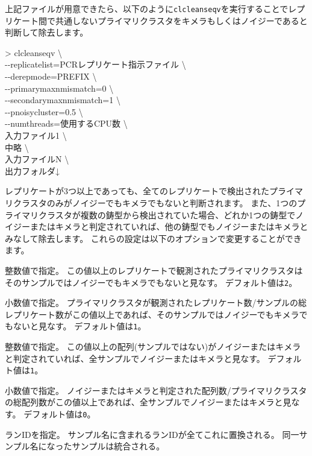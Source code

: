 \documentclass[titlepage,10pt,a4paper]{jsbook}
\newenvironment{cmd}{\begin{oframed}\raggedright\ttfamily\footnotesize\setlength{\baselineskip}{1.4em}}{\end{oframed}\vspace{-1em}}
\begin{document}
上記ファイルが用意できたら、以下のように\texttt{clcleanseqv}を実行することでレプリケート間で共通しないプライマリクラスタをキメラもしくはノイジーであると判断して除去します。
\begin{cmd}
{\textgreater} clcleanseqv {\textbackslash}\\
{-}{-}replicatelist=PCRレプリケート指示ファイル {\textbackslash}\\
{-}{-}derepmode=PREFIX {\textbackslash}\\
{-}{-}primarymaxnmismatch=0 {\textbackslash}\\
{-}{-}secondarymaxnmismatch=1 {\textbackslash}\\
{-}{-}pnoisycluster=0.5 {\textbackslash}\\
{-}{-}numthreads=使用するCPU数 {\textbackslash}\\
入力ファイル1 {\textbackslash}\\
中略 {\textbackslash}\\
入力ファイルN {\textbackslash}\\
出力フォルダ↓
\end{cmd}
レプリケートが3つ以上であっても、全てのレプリケートで検出されたプライマリクラスタのみがノイジーでもキメラでもないと判断されます。
また、1つのプライマリクラスタが複数の鋳型から検出されていた場合、どれか1つの鋳型でノイジーまたはキメラと判定されていれば、他の鋳型でもノイジーまたはキメラとみなして除去します。
これらの設定は以下のオプションで変更することができます。
\begin{description}\small\setlength{\baselineskip}{1.1em}
\item[\texttt{{-}{-}minnreplicate}] 整数値で指定。
この値以上のレプリケートで観測されたプライマリクラスタはそのサンプルではノイジーでもキメラでもないと見なす。
デフォルト値は\texttt{2}。
\item[\texttt{{-}{-}minpreplicate}] 小数値で指定。
プライマリクラスタが観測されたレプリケート数/サンプルの総レプリケート数がこの値以上であれば、そのサンプルではノイジーでもキメラでもないと見なす。
デフォルト値は\texttt{1}。
\item[\texttt{{-}{-}minnpositive}] 整数値で指定。
この値以上の配列(サンプルではない)がノイジーまたはキメラと判定されていれば、全サンプルでノイジーまたはキメラと見なす。
デフォルト値は\texttt{1}。
\item[\texttt{{-}{-}minppositive}] 小数値で指定。
ノイジーまたはキメラと判定された配列数/プライマリクラスタの総配列数がこの値以上であれば、全サンプルでノイジーまたはキメラと見なす。
デフォルト値は\texttt{0}。
\item[\texttt{{-}{-}runname}] ランIDを指定。
サンプル名に含まれるランIDが全てこれに置換される。
同一サンプル名になったサンプルは統合される。
\end{description}
\end{document}
